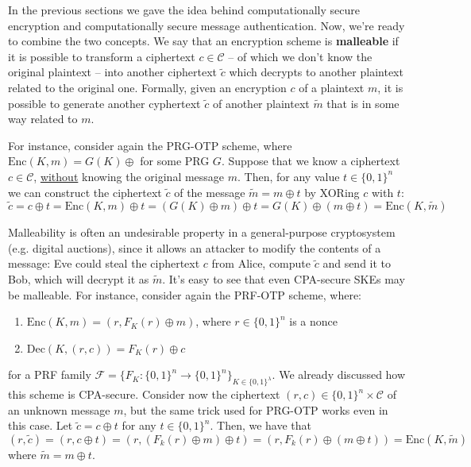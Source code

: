 \documentclass[a4paper, 12pt]{report}
\begin{document}
    In the previous sections we gave the idea behind computationally secure encryption and computationally secure message authentication. Now, we're ready to combine the two concepts. We say that an encryption scheme is \textbf{malleable} if it is possible to transform a  ciphertext $c \in \mathcal{C}$ -- of which we don't know the original plaintext -- into another ciphertext $\widetilde c$ which decrypts to another plaintext related to the original one. Formally, given an encryption $c$ of a plaintext $m$, it is possible to generate another cyphertext $\widetilde c$ of another plaintext $\widetilde m$ that is in some way related to $m$.
    
    For instance, consider again the PRG-OTP scheme, where $\mathrm{Enc}(K,m) = G(K) \oplus$ for some PRG $G$. Suppose that we know a ciphertext $c \in \mathcal{C}$, \underline{without} knowing the original message $m$. Then, for any value $t \in \{0,1\}^n$ we can construct the ciphertext $\widetilde c$ of the message $\widetilde m = m \oplus t$ by XORing $c$ with $t$:
    \[\widetilde c = c \oplus t = \mathrm{Enc}(K,m) \oplus t = (G(K) \oplus m ) \oplus t = G(K) \oplus (m \oplus t) = \mathrm{Enc}(K, \widetilde m)\]

    Malleability is often an undesirable property in a general-purpose cryptosystem (e.g. digital auctions), since it allows an attacker to modify the contents of a message: Eve could steal the ciphertext $c$ from Alice, compute $\widetilde c$ and send it to Bob, which will decrypt it as $\widetilde m$. It's easy to see that even CPA-secure SKEs may be malleable. For instance, consider again the PRF-OTP scheme, where:
    \begin{enumerate}
        \item $\mathrm{Enc}(K,m) = (r, F_K(r) \oplus m)$, where $r \in \{0,1\}^n$ is a nonce
        \item $\mathrm{Dec}(K,(r,c)) = F_K(r) \oplus c$
    \end{enumerate} 

    for a PRF family $\mathcal{F} = \{F_K : \{0,1\}^n \to \{0,1\}^n\}_{K \in \{0,1\}^\lambda}$. We already discussed how this scheme is CPA-secure. Consider now the ciphertext $(r,c) \in \{0,1\}^n \times \mathcal{C}$ of an unknown message $m$, but the same trick used for PRG-OTP works even in this case. Let $\tilde c = c \oplus t$ for any $t \in \{0,1\}^n$. Then, we have that
    \[(r, \tilde c) = (r, c \oplus t) = (r, (F_k(r) \oplus m) \oplus t) = (r, F_k(r) \oplus (m \oplus t)) = \mathrm{Enc}(K, \widetilde m)\]
    where $\widetilde m = m \oplus t$.
    
\end{document}
